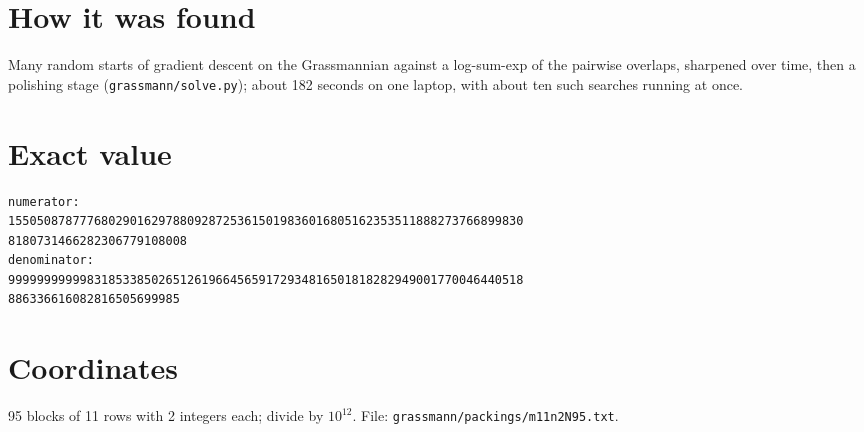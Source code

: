 \documentclass[11pt,a4paper]{article}
\begin{document}
\section{How it was found}
Many random starts of gradient descent on the Grassmannian against a log-sum-exp of the pairwise overlaps, sharpened over time, then a polishing stage (\texttt{grassmann/solve.py}); about 182 seconds on one laptop, with about ten such searches running at once.


\appendix
\section{Exact value}
{\small
\begin{verbatim}
numerator:
155050878777680290162978809287253615019836016805162353511888273766899830
8180731466282306779108008
denominator:
999999999998318533850265126196645659172934816501818282949001770046440518
886336616082816505699985
\end{verbatim}}

\section{Coordinates}
95 blocks of 11 rows with 2 integers each; divide by $10^{12}$. File: \texttt{grassmann/packings/m11n2N95.txt}.
{\tiny
\begin{multicols}{4}
\end{multicols}}
\end{document}
